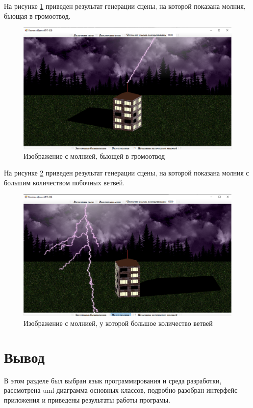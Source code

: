 На рисунке \ref{img:t3} приведен результат генерации сцены, на которой показана молния, бьющая в громоотвод.

\begin{figure}[H]
	\begin{center}
		\includegraphics[scale=0.38]{img/prog_res/t3.png}
	\end{center}
	\captionsetup{justification=centering}
	\caption{Изображение с молнией, бьющей в громоотвод}
	\label{img:t3}
\end{figure}

На рисунке \ref{img:t4} приведен результат генерации сцены, на которой показана молния с большим количеством побочных ветвей.

\begin{figure}[H]
	\begin{center}
		\includegraphics[scale=0.38]{img/prog_res/t4.png}
	\end{center}
	\captionsetup{justification=centering}
	\caption{Изображение с молнией, у которой большое количество ветвей}
	\label{img:t4}
\end{figure}


\section{Вывод}
В этом разделе был выбран язык программирования и среда разработки, рассмотрена uml-диаграмма основных классов, подробно разобран интерфейс приложения и приведены результаты работы програмы.